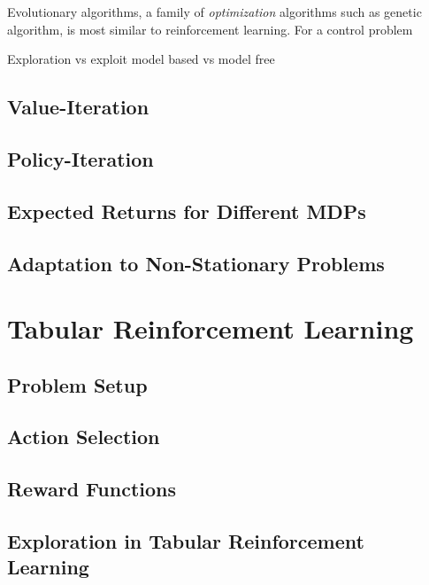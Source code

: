 Evolutionary algorithms, a family of \textit{optimization} algorithms such as genetic algorithm, is most similar to reinforcement learning.  For a control problem


Exploration vs exploit
model based vs model free





\subsection{Value-Iteration}
\subsection{Policy-Iteration}
\subsection{Expected Returns for Different MDPs}
\subsection{Adaptation to Non-Stationary Problems}




\section{Tabular Reinforcement Learning}
\subsection{Problem Setup}
\subsection{Action Selection}
\subsection{Reward Functions}
\subsection{Exploration in Tabular Reinforcement Learning}


